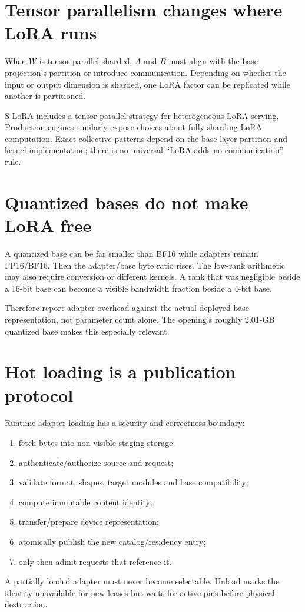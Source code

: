 \section{Tensor parallelism changes where LoRA runs}

When $W$ is tensor-parallel sharded, $A$ and $B$ must align with the base projection's
partition or introduce communication. Depending on whether the input or output
dimension is sharded, one LoRA factor can be replicated while another is partitioned.

S-LoRA includes a tensor-parallel strategy for heterogeneous LoRA serving. Production
engines similarly expose choices about fully sharding LoRA computation. Exact
collective patterns depend on the base layer partition and kernel implementation;
there is no universal ``LoRA adds no communication'' rule.

\section{Quantized bases do not make LoRA free}

A quantized base can be far smaller than BF16 while adapters remain FP16/BF16. Then
the adapter/base byte ratio rises. The low-rank arithmetic may also require conversion
or different kernels. A rank that was negligible beside a 16-bit base can become a
visible bandwidth fraction beside a 4-bit base.

Therefore report adapter overhead against the actual deployed base representation,
not parameter count alone. The opening's roughly 2.01-GB quantized base makes this
especially relevant.

\section{Hot loading is a publication protocol}

Runtime adapter loading has a security and correctness boundary:
\begin{enumerate}
\item fetch bytes into non-visible staging storage;
\item authenticate/authorize source and request;
\item validate format, shapes, target modules and base compatibility;
\item compute immutable content identity;
\item transfer/prepare device representation;
\item atomically publish the new catalog/residency entry;
\item only then admit requests that reference it.
\end{enumerate}
A partially loaded adapter must never become selectable. Unload marks the identity
unavailable for new leases but waits for active pins before physical destruction.

